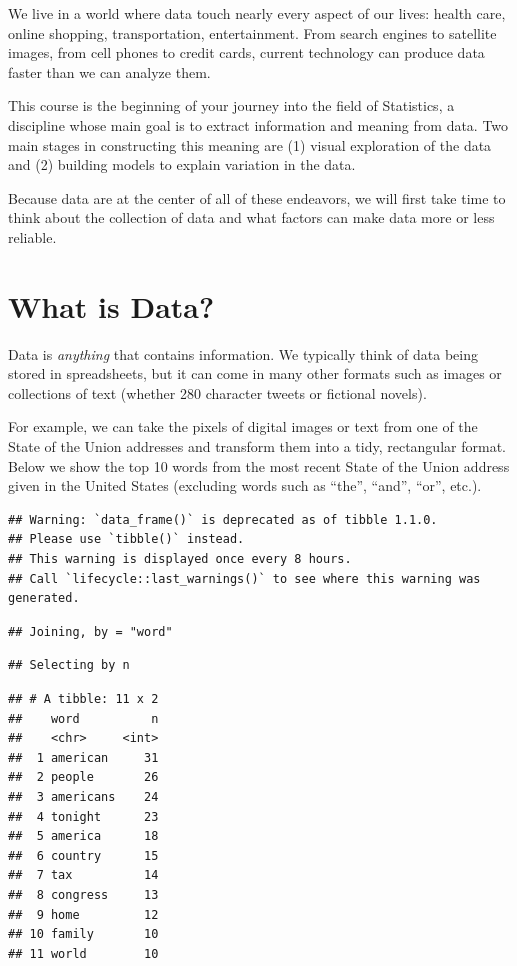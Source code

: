 \documentclass[
]{book}
\begin{document}
We live in a world where data touch nearly every aspect of our lives: health care, online shopping, transportation, entertainment. From search engines to satellite images, from cell phones to credit cards, current technology can produce data faster than we can analyze them.

This course is the beginning of your journey into the field of Statistics, a discipline whose main goal is to extract information and meaning from data. Two main stages in constructing this meaning are (1) visual exploration of the data and (2) building models to explain variation in the data.

Because data are at the center of all of these endeavors, we will first take time to think about the collection of data and what factors can make data more or less reliable.

\hypertarget{what-is-data}{%
\section{What is Data?}\label{what-is-data}}

Data is \emph{anything} that contains information. We typically think of data being stored in spreadsheets, but it can come in many other formats such as images or collections of text (whether 280 character tweets or fictional novels).

For example, we can take the pixels of digital images or text from one of the State of the Union addresses and transform them into a tidy, rectangular format. Below we show the top 10 words from the most recent State of the Union address given in the United States (excluding words such as ``the'', ``and'', ``or'', etc.).

\begin{verbatim}
## Warning: `data_frame()` is deprecated as of tibble 1.1.0.
## Please use `tibble()` instead.
## This warning is displayed once every 8 hours.
## Call `lifecycle::last_warnings()` to see where this warning was generated.
\end{verbatim}

\begin{verbatim}
## Joining, by = "word"
\end{verbatim}

\begin{verbatim}
## Selecting by n
\end{verbatim}

\begin{verbatim}
## # A tibble: 11 x 2
##    word          n
##    <chr>     <int>
##  1 american     31
##  2 people       26
##  3 americans    24
##  4 tonight      23
##  5 america      18
##  6 country      15
##  7 tax          14
##  8 congress     13
##  9 home         12
## 10 family       10
## 11 world        10
\end{verbatim}
\end{document}
